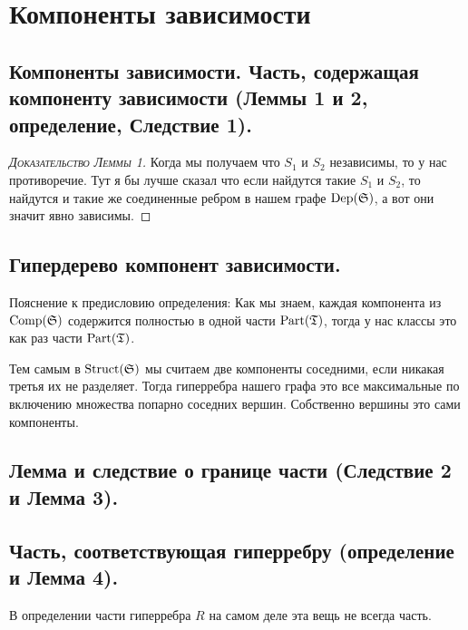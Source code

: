 \newpage

\section{Компоненты зависимости}

\subsection{Компоненты зависимости. Часть, содержащая компоненту зависимости (Леммы 1 и 2, определение, Следствие 1).}

\begin{proof}[\normalfont\textsc{Доказательство Леммы 1}]
	Когда мы получаем что $S_1$ и $S_2$ независимы, то у нас противоречие. Тут я бы лучше сказал что если найдутся такие $S_1$ и $S_2$, то найдутся и такие же соединенные ребром в нашем графе $\operatorname{Dep}(\mathfrak{S})$, а вот они значит явно зависимы.
\end{proof}

\subsection{Гипердерево компонент зависимости.}

Пояснение к предисловию определения:
Как мы знаем, каждая компонента из $\operatorname{Comp}(\mathfrak{S})$ содержится полностью в одной части  $\operatorname{Part}(\mathfrak{T})$, тогда у нас классы это как раз части  $\operatorname{Part}(\mathfrak{T})$.

Тем самым в $\operatorname{Struct}(\mathfrak{S})$ мы считаем две компоненты соседними, если никакая третья их не разделяет.
Тогда гиперребра нашего графа это все максимальные по включению множества попарно соседних вершин. Собственно вершины это сами компоненты.

\subsection{Лемма и следствие о границе части (Следствие 2 и Лемма 3).}
\subsection{Часть, соответствующая гиперребру (определение и Лемма 4).}

В определении части гиперребра $R$ на самом деле эта вещь не всегда часть.

